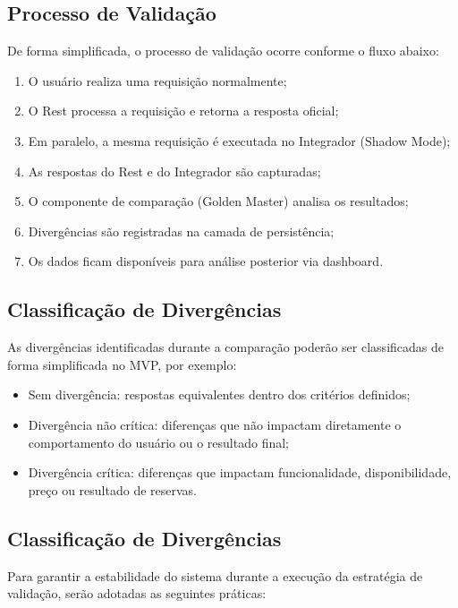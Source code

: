 \subsection{Processo de Validação}

De forma simplificada, o processo de validação ocorre conforme o fluxo abaixo:

\begin{enumerate}
    \item O usuário realiza uma requisição normalmente;
    \item O Rest processa a requisição e retorna a resposta oficial;
    \item Em paralelo, a mesma requisição é executada no Integrador (Shadow Mode);
    \item As respostas do Rest e do Integrador são capturadas;
    \item O componente de comparação (Golden Master) analisa os resultados;
    \item Divergências são registradas na camada de persistência;
    \item Os dados ficam disponíveis para análise posterior via dashboard.
\end{enumerate}

\subsection{Classificação de Divergências}

As divergências identificadas durante a comparação poderão ser classificadas de forma simplificada no MVP, por exemplo:

\begin{itemize}
    \item Sem divergência: respostas equivalentes dentro dos critérios definidos;
    \item Divergência não crítica: diferenças que não impactam diretamente o comportamento do usuário ou o resultado final;
    \item Divergência crítica: diferenças que impactam funcionalidade, disponibilidade, preço ou resultado de reservas.
\end{itemize}

\subsection{Classificação de Divergências}
Para garantir a estabilidade do sistema durante a execução da estratégia de validação, serão adotadas as seguintes práticas:

